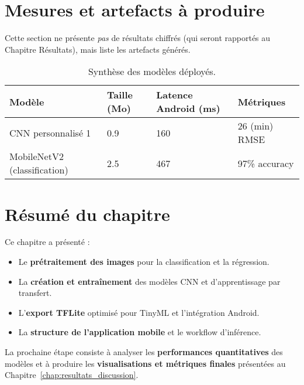 \section{Mesures et artefacts à produire}
\label{sec:mesures_artefacts}

Cette section ne présente \emph{pas} de résultats chiffrés (qui seront rapportés au Chapitre Résultats), mais liste les artefacts générés.

\begin{table}[h!]
	\centering
	\caption{Synthèse des modèles déployés.}
	\begin{tabular}{l l l l}
		\toprule
		Modèle                       & Taille (Mo) & Latence Android (ms) & Métriques             \\ \midrule
		CNN personnalisé 1           & 0.9         & 160                  & 26 (min) RMSE          \\
		MobileNetV2 (classification) & 2.5         & 467                  & 97\% accuracy           \\ \bottomrule
	\end{tabular}
\end{table}

\section{Résumé du chapitre}

Ce chapitre a présenté :

\begin{itemize}
	\item Le \textbf{prétraitement des images} pour la classification et la régression.
	\item La \textbf{création et entraînement} des modèles CNN et d’apprentissage par transfert.
	\item L’\textbf{export TFLite} optimisé pour TinyML et l’intégration Android.
	\item La \textbf{structure de l’application mobile} et le workflow d’inférence.
\end{itemize}

La prochaine étape consiste à analyser les \textbf{performances quantitatives} des modèles et à produire les \textbf{visualisations et métriques finales} présentées au Chapitre~\ref{chap:resultats_discussion}.
